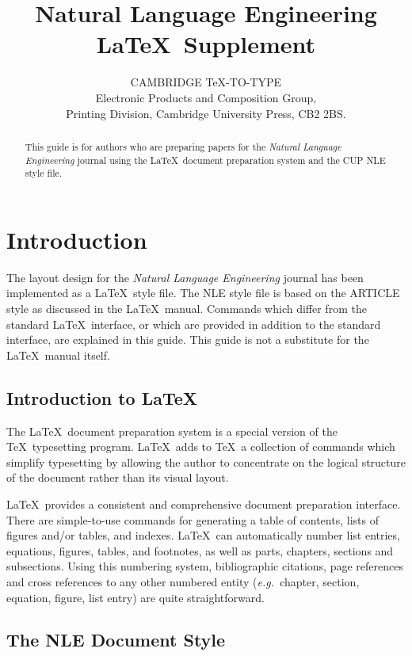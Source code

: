 \documentclass{nle}
\title[Natural Language Engineering]
      {Natural Language Engineering \LaTeX\ Supplement}
\author[\LaTeX\ Supplement]
       {C\ls A\ls M\ls B\ls R\ls I\ls D\ls G\ls E\ns
        \TeX\ls -\ls T\ls O\ls -\ls T\ls Y\ls P\ls E\\
        Electronic Products and Composition Group,\\
        Printing Division, Cambridge University Press,
        CB2 2BS.}
\newcommand\eg{{\it e.g.\ }}
\begin{document}
\label{firstpage}
\maketitle

\begin{abstract}
This guide is for authors who are preparing papers for the {\em Natural
Language Engineering\/} journal using the \LaTeX\ document preparation
system and the CUP NLE style file.
\end{abstract}

\section{Introduction}

The layout design for the {\em Natural Language Engineering\/} journal
has been implemented as a \LaTeX\ style file. The NLE style file is based
on the ARTICLE style as discussed in the \LaTeX\ manual. Commands which
differ from the standard \LaTeX\ interface, or which are provided in addition
to the standard interface, are explained in this guide. This guide is not a
substitute for the \LaTeX\ manual itself.

\subsection{Introduction to \LaTeX}

The \LaTeX\ document preparation system is a special version of the
\TeX\ typesetting program. \LaTeX\ adds to \TeX\ a collection of
commands which simplify typesetting by allowing the author to
concentrate on the logical structure of the document rather than
its visual layout.

\LaTeX\ provides a consistent and comprehensive document preparation
interface. There are simple-to-use commands for generating a table of
contents, lists of figures and/or tables, and indexes. \LaTeX\ can
automatically number list entries, equations, figures, tables, and
footnotes, as well as parts, chapters, sections and subsections.
Using this numbering system, bibliographic citations, page references
and cross references to any other numbered entity (\eg chapter,
section, equation, figure, list entry) are quite straightforward.

\subsection{The NLE Document Style}
\end{document}
